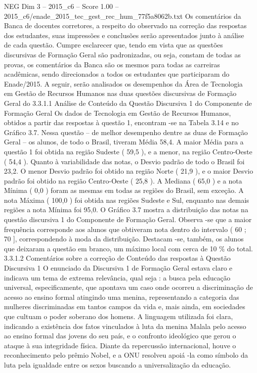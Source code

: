 \begin{textsample}{NEG Dim 3 – 2015\_c6 – Score 1.00 – 2015\_c6/enade\_2015\_tec\_gest\_rec\_hum\_77f5a8062b.txt}
Os comentários da Banca de docentes corretores, a respeito do observado na correção das respostas dos estudantes, suas impressões e conclusões serão apresentados junto à análise de cada questão.
Cumpre esclarecer que, tendo em vista que as questões discursivas de Formação Geral são padronizadas, ou seja, constam de todas as provas, os comentários da Banca são os mesmos para todas as carreiras acadêmicas, sendo direcionados a todos os estudantes que participaram do Enade/2015.
A seguir, serão analisados os desempenhos da Área de Tecnologia em Gestão de Recursos Humanos nas duas questões discursivas de Formação Geral do 3.3.1.1 Análise de Conteúdo da Questão Discursiva 1 do Componente de Formação Geral Os dados de Tecnologia em Gestão de Recursos Humanos, obtidos a partir das respostas à questão 1, encontram -se na Tabela 3.14 e no Gráfico 3.7.
Nessa questão – de melhor desempenho dentre as duas de Formação Geral – os alunos, de todo o Brasil, tiveram Média 58,4.
A maior Média para a questão 1 foi obtida na região Sudeste ( 59,5 ), e a menor, na região Centro-Oeste ( 54,4 ).
Quanto à variabilidade das notas, o Desvio padrão de todo o Brasil foi 23,2.
O menor Desvio padrão foi obtido na região Norte ( 21,9 ), e o maior Desvio padrão foi obtido na região Centro-Oeste ( 25,8 ).
A Mediana ( 65,0 ) e a nota Mínima ( 0,0 ) foram as mesmas em todas as regiões do Brasil, sem exceção.
A nota Máxima ( 100,0 ) foi obtida nas regiões Sudeste e Sul, enquanto nas demais regiões a nota Mínima foi 95,0.
O Gráfico 3.7 mostra a distribuição das notas na questão discursiva 1 do Componente de Formação Geral.
Observa -se que a maior frequência corresponde aos alunos que obtiveram nota dentro do intervalo ( 60 ; 70 ], correspondendo à moda da distribuição.
Destacam -se, também, os alunos que deixaram a questão em branco, um máximo local com cerca de 10 \% do total. 3.3.1.2 Comentários sobre a correção de Conteúdo das respostas à Questão Discursiva 1 O enunciado da Discursiva 1 de Formação Geral estava claro e indicava um tema de extrema relevância, qual seja : a busca pela educação universal, especificamente, que apontava um caso onde ocorreu a discriminação de acesso ao ensino formal atingindo uma menina, representando a categoria das mulheres discriminadas em tantos campos da vida e, mais ainda, em sociedades que cultuam o poder soberano dos homens.
A linguagem utilizada foi clara, indicando a existência dos fatos vinculados à luta da menina Malala pelo acesso ao ensino formal das jovens do seu país, e o confronto ideológico que gerou o ataque à sua integridade física.
Diante da repercussão internacional, houve o reconhecimento pelo prêmio Nobel, e a ONU resolveu apoiá -la como símbolo da luta pela igualdade entre os sexos buscando a universalização da educação.

\end{textsample}
